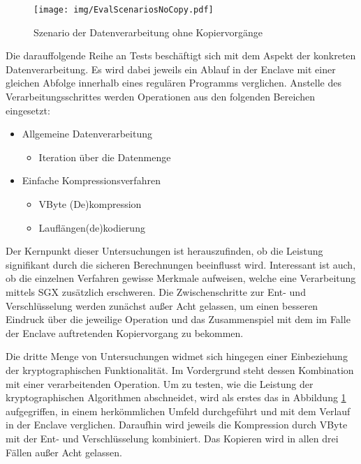 \begin{figure}[h]
	\texttt{[image: img/EvalScenariosNoCopy.pdf]}
	\centering
	\caption{Szenario der Datenverarbeitung ohne Kopiervorgänge}
	\label{fig:scenarionocopy}
\end{figure}

Die darauffolgende Reihe an Tests beschäftigt sich mit dem Aspekt der konkreten Datenverarbeitung. Es wird dabei jeweils ein Ablauf in der Enclave mit einer gleichen Abfolge innerhalb eines regulären Programms verglichen. Anstelle des Verarbeitungsschrittes werden Operationen aus den folgenden Bereichen eingesetzt:

\begin{itemize}
	\item Allgemeine Datenverarbeitung
	\begin{itemize}
		\item Iteration über die Datenmenge
	\end{itemize}
	\item Einfache Kompressionsverfahren
	\begin{itemize}
		\item VByte (De)kompression
		\item Lauflängen(de)kodierung
	\end{itemize}
\end{itemize}

Der Kernpunkt dieser Untersuchungen ist herauszufinden, ob die Leistung signifikant durch die sicheren Berechnungen beeinflusst wird. Interessant ist auch, ob die einzelnen Verfahren gewisse Merkmale aufweisen, welche eine Verarbeitung mittels SGX zusätzlich erschweren. Die Zwischenschritte zur Ent- und Verschlüsselung werden zunächst außer Acht gelassen, um einen besseren Eindruck über die jeweilige Operation und das Zusammenspiel mit dem im Falle der Enclave auftretenden Kopiervorgang zu bekommen.

Die dritte Menge von Untersuchungen widmet sich hingegen einer Einbeziehung der kryptographischen Funktionalität. Im Vordergrund steht dessen Kombination mit einer verarbeitenden Operation. Um zu testen, wie die Leistung der kryptographischen Algorithmen abschneidet, wird als erstes das in Abbildung \ref{fig:scenarionocopy} aufgegriffen, in einem herkömmlichen Umfeld durchgeführt und mit dem Verlauf in der Enclave verglichen. Daraufhin wird jeweils die Kompression durch VByte mit der Ent- und Verschlüsselung kombiniert. Das Kopieren wird in allen drei Fällen außer Acht gelassen.

